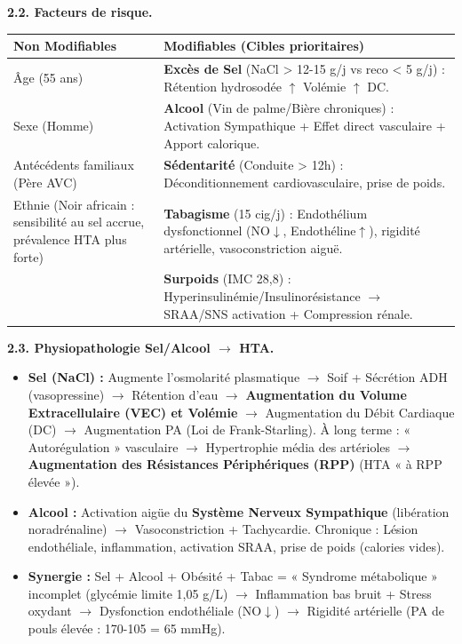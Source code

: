 \documentclass[11pt]{article}
\begin{document}
\begin{exoresolu}
\textbf{2.2. Facteurs de risque.}
\begin{center}
\begin{tabularx}{\linewidth}{|l|X|}\hline
\textbf{Non Modifiables} & \textbf{Modifiables (Cibles prioritaires)} \\ \hline
Âge (55 ans) & \textbf{Excès de Sel} (NaCl > 12-15 g/j vs reco < 5 g/j) : Rétention hydrosodée $\uparrow$ Volémie $\uparrow$ DC. \\
Sexe (Homme) & \textbf{Alcool} (Vin de palme/Bière chroniques) : Activation Sympathique + Effet direct vasculaire + Apport calorique. \\
Antécédents familiaux (Père AVC) & \textbf{Sédentarité} (Conduite > 12h) : Déconditionnement cardiovasculaire, prise de poids. \\
Ethnie (Noir africain : sensibilité au sel accrue, prévalence HTA plus forte) & \textbf{Tabagisme} (15 cig/j) : Endothélium dysfonctionnel (NO$\downarrow$, Endothéline$\uparrow$), rigidité artérielle, vasoconstriction aiguë. \\
& \textbf{Surpoids} (IMC 28,8) : Hyperinsulinémie/Insulinorésistance $\rightarrow$ SRAA/SNS activation + Compression rénale. \\ \hline
\end{tabularx}
\end{center}

\textbf{2.3. Physiopathologie Sel/Alcool $\rightarrow$ HTA.}
\begin{itemize}
    \item \textbf{Sel (NaCl) :} Augmente l'osmolarité plasmatique $\rightarrow$ Soif + Sécrétion ADH (vasopressine) $\rightarrow$ Rétention d'eau $\rightarrow$ \textbf{Augmentation du Volume Extracellulaire (VEC) et Volémie} $\rightarrow$ Augmentation du Débit Cardiaque (DC) $\rightarrow$ Augmentation PA (Loi de Frank-Starling). À long terme : « Autorégulation » vasculaire $\rightarrow$ Hypertrophie média des artérioles $\rightarrow$ \textbf{Augmentation des Résistances Périphériques (RPP)} (HTA « à RPP élevée »).
    \item \textbf{Alcool :} Activation aigüe du \textbf{Système Nerveux Sympathique} (libération noradrénaline) $\rightarrow$ Vasoconstriction + Tachycardie. Chronique : Lésion endothéliale, inflammation, activation SRAA, prise de poids (calories vides).
    \item \textbf{Synergie :} Sel + Alcool + Obésité + Tabac = « Syndrome métabolique » incomplet (glycémie limite 1,05 g/L) $\rightarrow$ Inflammation bas bruit + Stress oxydant $\rightarrow$ Dysfonction endothéliale (NO$\downarrow$) $\rightarrow$ Rigidité artérielle (PA de pouls élevée : 170-105 = 65 mmHg).
\end{itemize}


\end{exoresolu}
\end{document}
